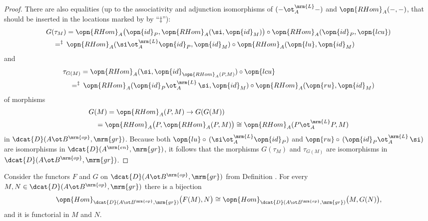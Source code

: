 \begin{proof}
There are also  equalities (up to the associativity and adjunction isomorphisms 
of $(- \ot_A^{\mrm{L}} -)$ and $\opn{RHom}_A(-,-)$, 
that should be inserted in the locations marked by by ``$\ddag$''): 
\begin{equation} \label{eqn:3997}
\begin{aligned}
& G(\tau_M) = 
\opn{RHom}_A \bigl( \opn{id}_P,  \opn{RHom}_A(\si, \opn{id}_M) \bigr) 
\circ 
\opn{RHom}_A(\opn{id}_P, \opn{lcu}) \\
& \quad =^{\ddag} \, 
\opn{RHom}_A(\si \ot_A^{\mrm{L}} \opn{id}_P, \opn{id}_M) \circ  
\opn{RHom}_A(\opn{lu}, \opn{id}_M) 
\end{aligned}
\end{equation}
and 
\begin{equation} \label{eqn:3998}
\begin{aligned}
& \tau_{G(M)} = \opn{RHom}_A(\si, \opn{id}_{\opn{RHom}_A(P, M)}) \circ 
\opn{lcu} \\
& \quad =^{\ddag} \, 
\opn{RHom}_A(\opn{id}_P \ot_A^{\mrm{L}} \, \si, \opn{id}_M) 
\circ  \opn{RHom}_A(\opn{ru}, \opn{id}_M) 
\end{aligned}
\end{equation}
of morphisms
\[ \begin{aligned}
& G(M) = \opn{RHom}_A(P, M) \to G(G(M))
\\
&
\quad = \opn{RHom}_A \bigl( P, \opn{RHom}_A(P, M) \bigr) \cong
\opn{RHom}_A(P \ot_A^{\mrm{L}} P, M) 
\end{aligned}   \]
in $\dcat{D}(A \ot B^{\mrm{op}}, \mrm{gr})$. 
Because both 
$\opn{lu} \circ \, (\si \ot_A^{\mrm{L}} \opn{id}_P)$ and 
$\opn{ru} \circ \, (\opn{id}_P \ot_A^{\mrm{L}} \, \si)$ 
are isomorphisms  in $\dcat{D}(A^{\mrm{en}}, \mrm{gr})$, it follows that the 
morphisms $G(\tau_M)$ and $\tau_{G(M)}$ are isomorphisms in 
$\dcat{D}(A \ot B^{\mrm{op}}, \mrm{gr})$. 
\end{proof}

\begin{lem} \label{lem:3996}
Consider the functors $F$ and $G$ on $\dcat{D}(A \ot B^{\mrm{op}}, \mrm{gr})$ 
from Definition \tup{\ref{dfn:3996}}. For every 
$M, N \in \dcat{D}(A \ot B^{\mrm{op}}, \mrm{gr})$ there is a bijection 
\[ \opn{Hom}_{\dcat{D}(A \ot B^{\mrm{op}}, \mrm{gr})} \bigl( F(M), N \bigr) 
\cong 
\opn{Hom}_{\dcat{D}(A \ot B^{\mrm{op}}, \mrm{gr})} \bigl( M, G(N) \bigr) , \]
and it is functorial in $M$ and $N$.  
\end{lem}


